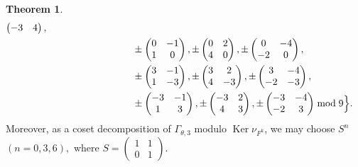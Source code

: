 \documentclass[12pt]{article}
\theoremstyle{definition}
\newtheorem{theorem}{Theorem}
\numberwithin{equation}{section}
\numberwithin{theorem}{section}
\newcommand{\Ker}{\operatorname{Ker}}
\begin{document}
\begin{theorem}
{\begin{align*}
\begin{pmatrix}
-3 & 4
\end{pmatrix},   \\
&\hspace{31mm}
\pm
\begin{pmatrix}
0 & -1 \\
1 & 0
\end{pmatrix}, 
\pm
\begin{pmatrix}
0 & 2 \\
4 & 0
\end{pmatrix}, 
\pm
\begin{pmatrix}
0 & -4 \\
-2 & 0
\end{pmatrix},  \notag \\
&\hspace{31mm}
\pm
\begin{pmatrix}
3 & -1 \\
1 & -3
\end{pmatrix},  
\pm
\begin{pmatrix}
3 & 2 \\
4 & -3
\end{pmatrix}, 
\pm
\begin{pmatrix}
3 & -4 \\
-2 & -3
\end{pmatrix}, \notag \\
&\hspace{31mm}
\pm
\begin{pmatrix}
-3 & -1 \\
1 & 3
\end{pmatrix}, 
\pm
\begin{pmatrix}
-3 & 2 \\
4 & 3
\end{pmatrix},  
\pm
\begin{pmatrix}
-3 & -4 \\
-2 & 3
\end{pmatrix} 
\bmod{9}
\Big\}.
\end{align*}
Moreover, 
as a coset decomposition of $\Gamma_{\theta,3}$ modulo $\Ker \nu_{F^{k}}$,  
we may choose $S^{n}$ $(n=0,3,6),$ where 
$
S=
\begin{pmatrix}
1 & 1 \\
0 & 1
\end{pmatrix}. 
$
}
\end{theorem}
\end{document}

